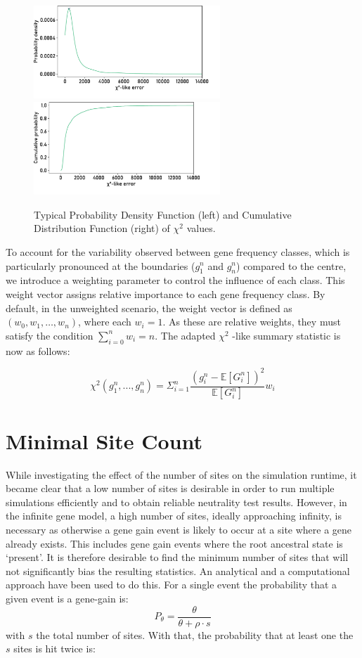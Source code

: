 \begin{figure}[]
    \centering
    \includegraphics[height=3.5cm]{figures/pdf.pdf}
    \includegraphics[height=3.5cm]{figures/cdf.pdf}
    \caption[Typical PDF and CDF.]{Typical Probability Density Function (left) and Cumulative Distribution Function (right) of $\chi^2$ values.}
    \label{fig:pdf-cdf}
\end{figure}
\newpage
To account for the variability observed between gene frequency classes, which is particularly pronounced at the boundaries ($g_1^n$ and $g_n^n$) compared to the centre, we introduce a weighting parameter to control the influence of each class.
This weight vector assigns relative importance to each gene frequency class.
By default, in the unweighted scenario, the weight vector is defined as $(w_0, w_1, \ldots, w_n)$, where each $w_i = 1$.
As these are relative weights, they must satisfy the condition $\sum_{i=0}^n w_i = n$.
The adapted $\chi^2$ -like summary statistic is now as follows:

\begin{equation}
    \chi^2(g_1^n, ..., g_n^n) = \Sigma^n_{i=1} \frac{(g_i^n-\mathbb{E}[G_i^n])^2}{\mathbb{E}[G_i^n]} w_i
\end{equation}

\section{Minimal Site Count}

While investigating the effect of the number of sites on the simulation runtime,
it became clear that a low number of sites is desirable in order to run multiple simulations efficiently and to obtain reliable neutrality test results.
However, in the infinite gene model, a high number of sites, ideally approaching infinity, is necessary as otherwise a gene gain event is likely to occur at a site where a gene already exists.
This includes gene gain events where the root ancestral state is `present'.
It is therefore desirable to find the minimum number of sites that will not significantly bias the resulting statistics.
An analytical and a computational approach have been used to do this.
For a single event the probability that a given event is a gene-gain is:
$$P_\theta = \frac{\theta}{\theta + \rho \cdot s}$$
with $s$ the total number of sites.
With that, the probability that at least one the $s$ sites is hit twice is:

